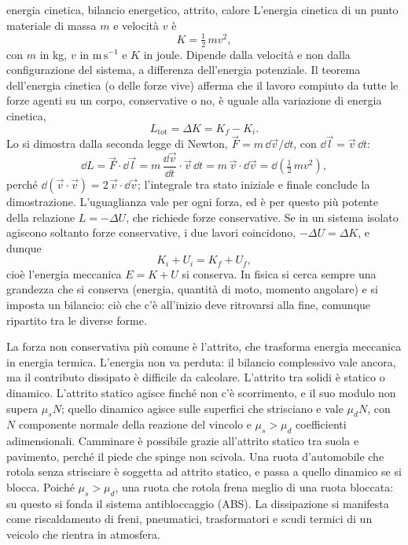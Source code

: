 \documentclass[main.tex]{subfiles}
\begin{document}
\renewcommand{\richiamoprefix}{Richiamo di Fisica 1 --- }
\begin{riquadro}{energia cinetica, bilancio energetico, attrito, calore}
L'energia cinetica di un punto materiale di massa $m$ e velocità $v$ è
\[
K=\tfrac12\,mv^2 ,
\]
con $m$ in kg, $v$ in $\mathrm{m\,s^{-1}}$ e $K$ in joule. Dipende dalla velocità e non dalla configurazione del sistema, a differenza dell'energia potenziale. Il teorema dell'energia cinetica (o delle forze vive) afferma che il lavoro compiuto da tutte le forze agenti su un corpo, conservative o no, è uguale alla variazione di energia cinetica,
\[
L_{\mathrm{tot}}=\Delta K=K_f-K_i .
\]
Lo si dimostra dalla seconda legge di Newton, $\vec F=m\,\dd\vec v/\dd t$, con $\dd\vec l=\vec v\,\dd t$:
\[
\dd L=\vec F\cdot\dd\vec l=m\,\frac{\dd\vec v}{\dd t}\cdot\vec v\,\dd t=m\,\vec v\cdot\dd\vec v=\dd\!\left(\tfrac12\,mv^2\right),
\]
perché $\dd(\vec v\cdot\vec v)=2\,\vec v\cdot\dd\vec v$; l'integrale tra stato iniziale e finale conclude la dimostrazione. L'uguaglianza vale per ogni forza, ed è per questo più potente della relazione $L=-\Delta U$, che richiede forze conservative. Se in un sistema isolato agiscono soltanto forze conservative, i due lavori coincidono, $-\Delta U=\Delta K$, e dunque
\[
K_i+U_i=K_f+U_f ,
\]
cioè l'energia meccanica $E=K+U$ si conserva. In fisica si cerca sempre una grandezza che si conserva (energia, quantità di moto, momento angolare) e si imposta un bilancio: ciò che c'è all'inizio deve ritrovarsi alla fine, comunque ripartito tra le diverse forme.

La forza non conservativa più comune è l'attrito, che trasforma energia meccanica in energia termica. L'energia non va perduta: il bilancio complessivo vale ancora, ma il contributo dissipato è difficile da calcolare. L'attrito tra solidi è statico o dinamico. L'attrito statico agisce finché non c'è scorrimento, e il suo modulo non supera $\mu_sN$; quello dinamico agisce sulle superfici che strisciano e vale $\mu_dN$, con $N$ componente normale della reazione del vincolo e $\mu_s>\mu_d$ coefficienti adimensionali. Camminare è possibile grazie all'attrito statico tra suola e pavimento, perché il piede che spinge non scivola. Una ruota d'automobile che rotola senza strisciare è soggetta ad attrito statico, e passa a quello dinamico se si blocca. Poiché $\mu_s>\mu_d$, una ruota che rotola frena meglio di una ruota bloccata: su questo si fonda il sistema antibloccaggio (ABS). La dissipazione si manifesta come riscaldamento di freni, pneumatici, trasformatori e scudi termici di un veicolo che rientra in atmosfera.


\end{riquadro}
\end{document}
